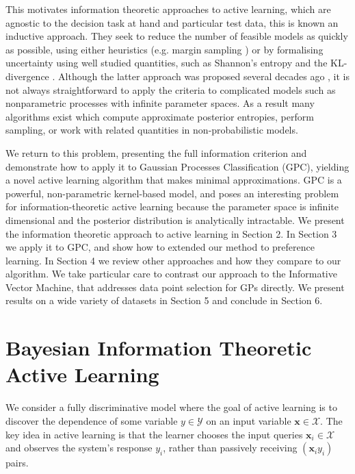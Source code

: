 \documentclass[twoside]{article}
\newcommand{\x}{\bm{x}}
\newcommand{\y}{y}
\begin{document}
This motivates information theoretic approaches to active learning, which are agnostic to the decision task at hand and particular test data, this is known an inductive approach. They seek to reduce the number of feasible models as quickly as possible, using either heuristics (e.g. margin sampling \cite{tong2001}) or by formalising uncertainty using well studied quantities, such as Shannon’s entropy and the KL-divergence \cite{coverandthomas}. Although the latter approach was proposed several decades ago \cite{lindley1956, bernardo1979}, it is not always straightforward to apply the criteria to complicated models such as nonparametric processes with infinite parameter spaces. As a result many algorithms exist which compute approximate posterior entropies, perform sampling, or work with related quantities in non-probabilistic models.

We return to this problem, presenting the full information criterion and demonstrate how to apply it to Gaussian Processes Classification (GPC), yielding a novel active learning algorithm that makes minimal approximations. GPC is a powerful, non-parametric kernel-based model, and poses an interesting problem for information-theoretic active learning because the parameter space is infinite dimensional and the posterior distribution is analytically intractable. We present the information theoretic approach to active learning in Section 2. In Section 3 we apply it to GPC, and show how to extended our method to preference learning. In Section 4 we review other approaches and how they compare to our algorithm. We take particular care to contrast our approach to the Informative Vector Machine, that addresses data point selection for GPs directly. We present results on a wide variety of datasets in Section 5 and conclude in Section 6.

\section{Bayesian Information Theoretic Active Learning}

We consider a fully discriminative model where the goal of active learning is to discover the dependence of some variable $\y\in\mathcal{Y}$ on an input variable $\x\in\mathcal{X}$. The key idea in active learning is that the learner chooses the input queries $\x_i\in\mathcal{X}$ and observes the system's response $\y_i$, rather than passively receiving $(\x_i \y_i)$ pairs.
\end{document}
